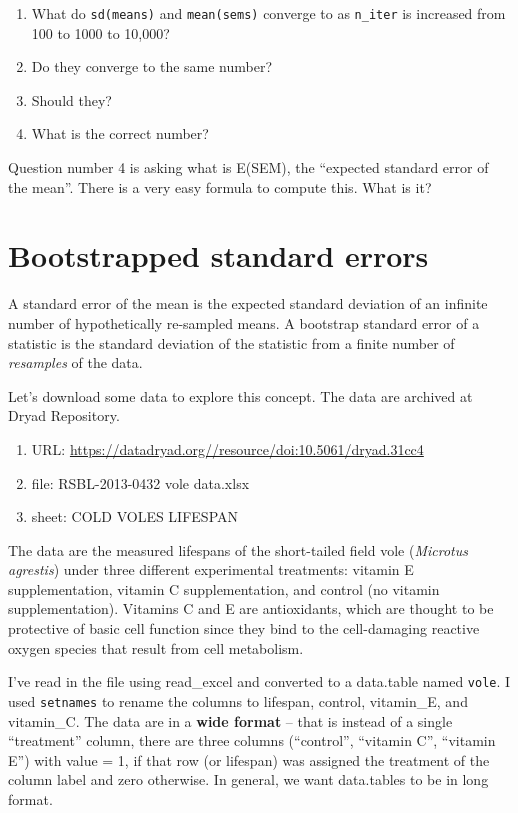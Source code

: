 \documentclass[]{book}
\providecommand{\tightlist}{%
  \setlength{\itemsep}{0pt}\setlength{\parskip}{0pt}}
\begin{document}
\begin{enumerate}
\def\labelenumi{\arabic{enumi}.}
\tightlist
\item
  What do \texttt{sd(means)} and \texttt{mean(sems)} converge to as
  \texttt{n\_iter} is increased from 100 to 1000 to 10,000?
\item
  Do they converge to the same number?
\item
  Should they?
\item
  What is the correct number?
\end{enumerate}

Question number 4 is asking what is E(SEM), the ``expected standard
error of the mean''. There is a very easy formula to compute this. What
is it?

\section{Bootstrapped standard
errors}\label{bootstrapped-standard-errors}

A standard error of the mean is the expected standard deviation of an
infinite number of hypothetically re-sampled means. A bootstrap standard
error of a statistic is the standard deviation of the statistic from a
finite number of \emph{resamples} of the data.

Let's download some data to explore this concept. The data are archived
at Dryad Repository.

\begin{enumerate}
\def\labelenumi{\arabic{enumi}.}
\tightlist
\item
  URL: \url{https://datadryad.org//resource/doi:10.5061/dryad.31cc4}
\item
  file: RSBL-2013-0432 vole data.xlsx
\item
  sheet: COLD VOLES LIFESPAN
\end{enumerate}

The data are the measured lifespans of the short-tailed field vole
(\emph{Microtus agrestis}) under three different experimental
treatments: vitamin E supplementation, vitamin C supplementation, and
control (no vitamin supplementation). Vitamins C and E are antioxidants,
which are thought to be protective of basic cell function since they
bind to the cell-damaging reactive oxygen species that result from cell
metabolism.

I've read in the file using read\_excel and converted to a data.table
named \texttt{vole}. I used \texttt{setnames} to rename the columns to
lifespan, control, vitamin\_E, and vitamin\_C. The data are in a
\textbf{wide format} -- that is instead of a single ``treatment''
column, there are three columns (``control'', ``vitamin C'', ``vitamin
E'') with value = 1, if that row (or lifespan) was assigned the
treatment of the column label and zero otherwise. In general, we want
data.tables to be in long format.
\end{document}
